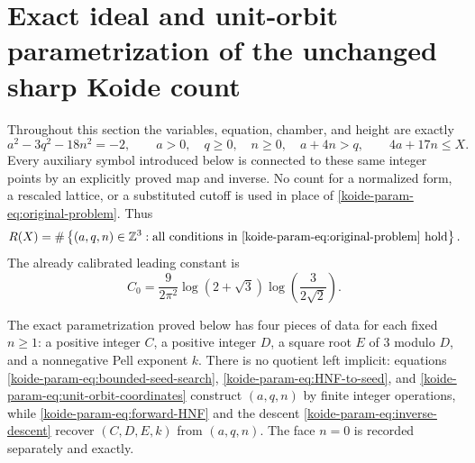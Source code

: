 \providecommand{\OO}{\mathcal O}
\providecommand{\NN}{\mathbb N}
\providecommand{\ZZ}{\mathbb Z}
\providecommand{\RR}{\mathbb R}
\providecommand{\QQ}{\mathbb Q}
\providecommand{\Norm}{\operatorname N}
\providecommand{\Tr}{\operatorname {Tr}}
\providecommand{\e}{\varepsilon}

\section{Exact ideal and unit-orbit parametrization of the unchanged sharp Koide count}

Throughout this section the variables, equation, chamber, and height are
exactly
\begin{equation}
 a^2-3q^2-18n^2=-2,
 \qquad
 a>0,\quad q\geq0,\quad n\geq0,\quad a+4n>q,
 \qquad
 4a+17n\leq X.
 \label{koide-param-eq:original-problem}
\end{equation}
Every auxiliary symbol introduced below is connected to these same integer
points by an explicitly proved map and inverse.  No count for a normalized
form, a rescaled lattice, or a substituted cutoff is used in place of
\eqref{koide-param-eq:original-problem}.
Thus
\begin{equation}
 R(X)=\#\left\{(a,q,n)\in\ZZ^3:\text{all conditions in
 \eqref{koide-param-eq:original-problem} hold}\right\}.
 \label{koide-param-eq:R-definition}
\end{equation}
The already calibrated leading constant is
\begin{equation}
 C_0=
 \frac9{2\pi^2}\log(2+\sqrt3)
 \log\!\left(\frac3{2\sqrt2}\right).
 \label{koide-param-eq:C0}
\end{equation}

The exact parametrization proved below has four pieces of data for each
fixed $n\geq1$: a positive integer $C$, a positive integer $D$, a square
root $E$ of $3$ modulo $D$, and a nonnegative Pell exponent $k$.  There is
no quotient left implicit: equations \eqref{koide-param-eq:bounded-seed-search},
\eqref{koide-param-eq:HNF-to-seed}, and \eqref{koide-param-eq:unit-orbit-coordinates} construct
$(a,q,n)$ by finite integer operations, while
\eqref{koide-param-eq:forward-HNF} and the descent \eqref{koide-param-eq:inverse-descent} recover
$(C,D,E,k)$ from $(a,q,n)$.  The face $n=0$ is recorded separately and
exactly.

